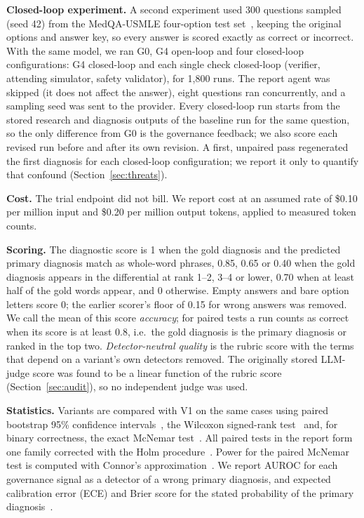 \documentclass[conference]{IEEEtran}
\begin{document}
\textbf{Closed-loop experiment.} A second experiment used 300 questions sampled (seed 42) from the
MedQA-USMLE four-option test set~\cite{jin2021medqa}, keeping the original options and answer key, so every answer
is scored exactly as correct or incorrect. With the same model, we ran G0, G4 open-loop and four closed-loop
configurations: G4 closed-loop and each single check closed-loop (verifier, attending simulator,
safety validator), for 1,800 runs. The report agent was skipped (it does not affect the answer), eight questions
ran concurrently, and a sampling seed was sent to the provider. Every closed-loop run starts from the stored
research and diagnosis outputs of the baseline run for the same question, so the only difference from G0 is the
governance feedback; we also score each revised run before and after its own revision. A first, unpaired pass
regenerated the first diagnosis for each closed-loop configuration; we report it only to quantify that confound
(Section~\ref{sec:threats}).

\textbf{Cost.} The trial endpoint did not bill. We report cost at an assumed rate of \$0.10 per million input and %
\$0.20 per million output tokens, applied to measured token counts. %

\textbf{Scoring.} The diagnostic score is 1 when the gold diagnosis and the predicted primary diagnosis match as
whole-word phrases, 0.85, 0.65 or 0.40 when the gold diagnosis appears in the differential at rank 1--2, 3--4 or %
lower, 0.70 when at least half of the gold words appear, and 0 otherwise. Empty answers and bare option letters %
score 0; the earlier scorer's floor of 0.15 for wrong answers was removed. We call the mean of this score %
\emph{accuracy}; for paired tests a run counts as correct when its score is at least 0.8, i.e.\ the gold diagnosis %
is the primary diagnosis or ranked in the top two.
\emph{Detector-neutral quality} is the rubric score with the terms that depend on a variant's own detectors removed.
The originally stored LLM-judge score was found to be a linear function of the rubric score (Section~\ref{sec:audit}),
so no independent judge was used.

\textbf{Statistics.} Variants are compared with V1 on the same cases using paired bootstrap 95\% confidence
intervals~\cite{efron1979bootstrap}, the Wilcoxon signed-rank test~\cite{wilcoxon1945individual} and, for binary
correctness, the exact McNemar test~\cite{mcnemar1947note}. All paired tests in the report form one family corrected
with the Holm procedure~\cite{holm1979simple}. Power for the paired McNemar test is computed with Connor's
approximation~\cite{connor1987sample}. We report AUROC for
each governance signal as a detector of a wrong primary diagnosis, and expected calibration error (ECE) and Brier
score for the stated probability of the primary diagnosis~\cite{guo2017calibration}.
\end{document}
